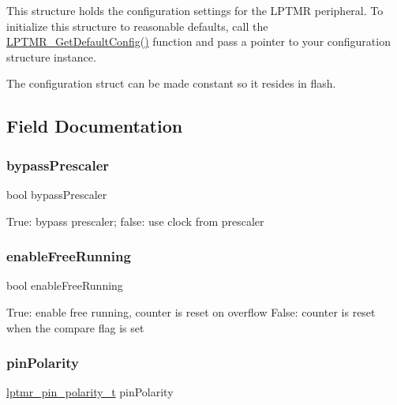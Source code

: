 This structure holds the configuration settings for the L\+P\+T\+MR peripheral. To initialize this structure to reasonable defaults, call the \mbox{\hyperlink{group__lptmr_ga11a8100adcd8f9f0cf167b2d84a51d11}{L\+P\+T\+M\+R\+\_\+\+Get\+Default\+Config()}} function and pass a pointer to your configuration structure instance.

The configuration struct can be made constant so it resides in flash. 

\subsection{Field Documentation}
\mbox{\label{struct__lptmr__config_aec33382dd1c7d9912c9fd022b68d07c5}} 
\subsubsection{\texorpdfstring{bypassPrescaler}{bypassPrescaler}}
{\footnotesize\ttfamily bool bypass\+Prescaler}

True\+: bypass prescaler; false\+: use clock from prescaler \mbox{\label{struct__lptmr__config_a8e4fd702efe3170ad2d4ec0b79cabe3a}} 
\subsubsection{\texorpdfstring{enableFreeRunning}{enableFreeRunning}}
{\footnotesize\ttfamily bool enable\+Free\+Running}

True\+: enable free running, counter is reset on overflow False\+: counter is reset when the compare flag is set \mbox{\label{struct__lptmr__config_a81e732928dcad4ce95e1fd4c3c801d1f}} 
\subsubsection{\texorpdfstring{pinPolarity}{pinPolarity}}
{\footnotesize\ttfamily \mbox{\hyperlink{group__lptmr_gaa2ac38a4cb3ac1cfb704baec44f4174c}{lptmr\+\_\+pin\+\_\+polarity\+\_\+t}} pin\+Polarity}

